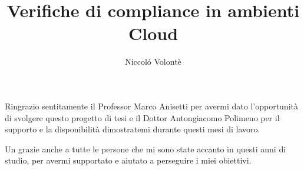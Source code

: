 \documentclass[twoside,12pt]{report}
\title{Verifiche di compliance in ambienti Cloud}
\author{Niccoló Volontè}
\begin{document}
    
    \makecenteredfrontpage
    
    
    	
    	
    	
    
    
    
    

    \cleardoublepage
    

    Ringrazio sentitamente il Professor Marco Anisetti per avermi dato l'opportunità di svolgere questo progetto di tesi e il Dottor Antongiacomo Polimeno per il supporto e la disponibilità dimostratemi durante questi mesi di lavoro.

    \vspace{1em}

    Un grazie anche a tutte le persone che mi sono state accanto in questi anni di studio, per avermi supportato e aiutato a perseguire i miei obiettivi.



    
    \afterpreface

    \shipout\null
        
    

    
\end{document}
